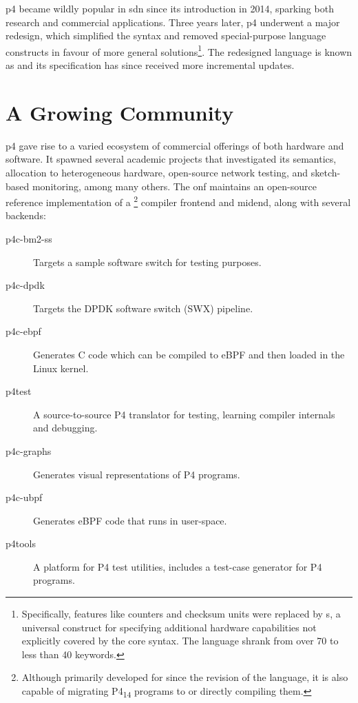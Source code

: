 \acrshort{p4} became wildly popular in \acrshort{sdn} since its introduction in
2014\cite{p4original}, sparking both research and commercial applications. Three
years later, \acrshort{p4} underwent a major redesign\cite{p416}, which
simplified the syntax and removed special-purpose language constructs in favour
of more general solutions\footnote{Specifically, features like counters and
checksum units were replaced by \extern{}s, a universal construct for specifying
additional hardware capabilities not explicitly covered by the core syntax. The
language shrank from over 70 to less than 40
keywords\cite{p416:v1:spec:comparison}.}. The redesigned language is known as
\pfs\cite{p416:v123:spec} and its specification has since received more
incremental updates.

\section*{A Growing Community}

\acrshort{p4} gave rise to a varied ecosystem of commercial offerings of both
hardware and software. It spawned several academic projects that investigated
its semantics\cite{doenges2021petr4}, allocation to heterogeneous
hardware\cite{sultana2021flightplan}, open-source network
testing\cite{antichi2014osnt}, and sketch-based
monitoring\cite{namkung2022sketchlib}, among many
others\cite{liatifis2023advancingp4survey}. The \acrfull{onf}
maintains\cite{p4onf} an open-source reference implementation of a
\pfs\footnote{Although primarily developed for \pfs since the revision of the
language, it is also capable of migrating P4\textsubscript{14} programs to \pfs
or directly compiling them.} compiler frontend and mid\-end, along with several
backends:

\begin{description}
	\item[p4c-bm2-ss] Targets a sample software switch for testing purposes.
	\item[p4c-dpdk] Targets the DPDK software switch (SWX) pipeline\cite{dpdkDPDKRelease}.
	\item[p4c-ebpf] Generates C code which can be compiled to eBPF
		and then loaded in the Linux kernel.
	\item[p4test] A source-to-source P4 translator for testing, learning compiler
		internals and debugging.
	\item[p4c-graphs] Generates visual representations of P4 programs.
	\item[p4c-ubpf] Generates eBPF code that runs in user-space.
	\item[p4tools] A platform for P4 test utilities, includes a test-case
		generator for P4 programs.
\end{description}


